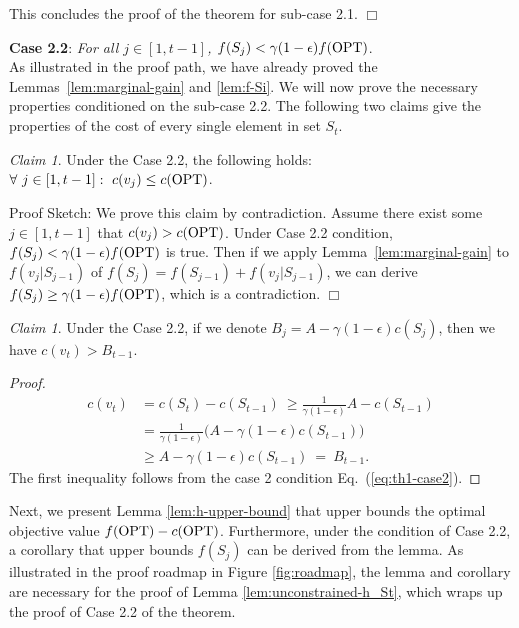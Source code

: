 \documentclass[10pt]{article} %
\theoremstyle{remark}
\newtheorem{claim}[theorem]{Claim}
\newcommand{\OPT}{{\rm OPT}}
\begin{document}
This concludes the proof of the theorem for sub-case 2.1.  \hfill $\Box$

\textbf{Case 2.2}: \textit{For all $j \in [1,t-1]$, $f(S_{j}) < \gamma (1-\epsilon)f(\OPT)$}.\\
As illustrated in the proof path, we have already
proved the Lemmas~\ref{lem:marginal-gain} and \ref{lem:f-Si}. We will now prove the necessary properties conditioned on the sub-case 2.2. The following two claims give the properties of the cost of every single element in set $S_t$.

\begin{claim}
\label{claim:single-cost}
Under the Case 2.2, the following holds: $\forall~ j \in [1, t-1]:~ c(v_j) \leq c(\OPT)$.
\end{claim}
{\sc Proof Sketch:} We prove this claim by contradiction. Assume there exist some $j \in [1, t-1]$ that $c(v_j)>c(\OPT)$. Under Case 2.2 condition, $f(S_j) < \gamma(1-\epsilon)f(\OPT)$ is true. Then if we apply Lemma~\ref{lem:marginal-gain} to $f(v_j|S_{j-1})$ of $f(S_j)= f(S_{j-1}) + f(v_j|S_{j-1})$, we can derive $f(S_j) \geq \gamma(1-\epsilon)f(\OPT)$, which is a contradiction. \hfill $\Box$

        
\begin{claim}
\label{claim:cost-St}
Under the Case 2.2, if we denote $B_j = A-\gamma(1-\epsilon) c(S_{j})$, then we have  $c(v_t) > B_{t-1}$.
\end{claim}

\begin{proof}
\begin{align*}
    c(v_t) &= c(S_t) - c(S_{t-1}) \ \geq \frac{1}{\gamma(1-\epsilon)}A- c(S_{t-1}) \\
    &= \frac{1}{\gamma(1-\epsilon)}\big(A-\gamma (1-\epsilon)c(S_{t-1})\big) \\
       & \geq   A- \gamma (1-\epsilon)c(S_{t-1})\ = \ B_{t-1}.
\end{align*}
The first inequality follows from the case 2 condition Eq.~(\ref{eq:th1-case2}).
\end{proof}

Next, we present Lemma \ref{lem:h-upper-bound} that upper bounds the optimal objective value $f(\OPT) - c(\OPT)$. Furthermore, under the condition of Case 2.2, a corollary that upper bounds $f(S_j)$ can be derived from the lemma. As illustrated in the proof roadmap in Figure \ref{fig:roadmap}, the lemma and corollary are necessary for the proof of Lemma \ref{lem:unconstrained-h_St}, which wraps up the proof of Case 2.2 of the theorem.
\end{document}
